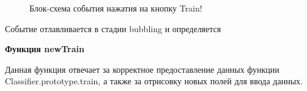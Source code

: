 \documentclass[14pt,a4paper]{extreport}
\begin{document}
    \begin{figure}[h]
    \caption{Блок-схема события нажатия на кнопку Train!}
    \label{ris:image}
    \end{figure}
    \par Событие отлавливается в стадии bubbling и определяется
    \newpage \par \small \textbf{Функция newTrain}
    \\ \par Данная функция отвечает за корректное предоставление данных функции \\ Classifier.prototype.train, а также за отрисовку новых полей для ввода данных.
\end{document}
